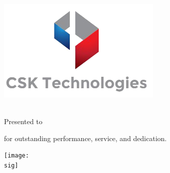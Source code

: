 \documentclass[pdftex,20pt,a4paper] {extarticle}
\begin{document}
\clearpage
\noindent\begin{minipage}{\linewidth}
	\begin{center}	
		\includegraphics[scale=.65]{./img/logo}
	\begin{spacing}{2.5}
		{\Huge \titleAward{}}
		\\
		Presented to 
		\\
		{\huge \recName{}}
	\end{spacing}
		for outstanding performance, service, and dedication.
	\end{center}
		\begin{minipage}[c]{0.50\textwidth}
			    \center\dateAward{}
		\end{minipage}
	\begin{minipage}[c]{0.5\textwidth}
		\begin{center}
		\begin{spacing}{0.5}
		\texttt{[image: \\sig]}
		\\
		\giveName{}
		\end{spacing}
		\end{center}
	\end{minipage}	
\end{minipage}
\end{document}
